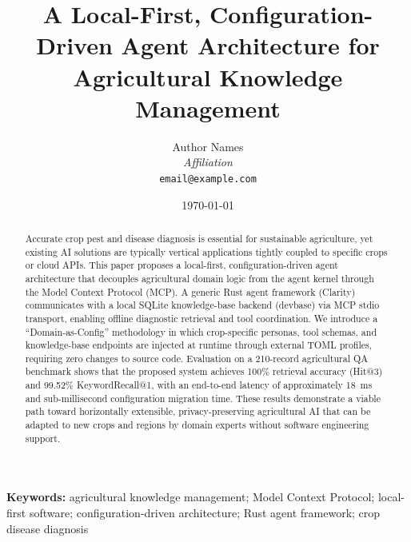 \documentclass[11pt,a4paper]{article}
\title{A Local-First, Configuration-Driven Agent Architecture for Agricultural Knowledge Management}
\author{Author Names\\
        \textit{Affiliation}\\
        \texttt{email@example.com}}
\date{\today}
\begin{document}
\maketitle

\begin{abstract}
Accurate crop pest and disease diagnosis is essential for sustainable agriculture, yet existing AI solutions are typically vertical applications tightly coupled to specific crops or cloud APIs. This paper proposes a local-first, configuration-driven agent architecture that decouples agricultural domain logic from the agent kernel through the Model Context Protocol (MCP). A generic Rust agent framework (Clarity) communicates with a local SQLite knowledge-base backend (devbase) via MCP stdio transport, enabling offline diagnostic retrieval and tool coordination. We introduce a ``Domain-as-Config'' methodology in which crop-specific personas, tool schemas, and knowledge-base endpoints are injected at runtime through external TOML profiles, requiring zero changes to source code. Evaluation on a 210-record agricultural QA benchmark shows that the proposed system achieves 100\% retrieval accuracy (Hit@3) and 99.52\% KeywordRecall@1, with an end-to-end latency of approximately 18~ms and sub-millisecond configuration migration time. These results demonstrate a viable path toward horizontally extensible, privacy-preserving agricultural AI that can be adapted to new crops and regions by domain experts without software engineering support.
\end{abstract}

\textbf{Keywords:} agricultural knowledge management; Model Context Protocol; local-first software; configuration-driven architecture; Rust agent framework; crop disease diagnosis










\end{document}
